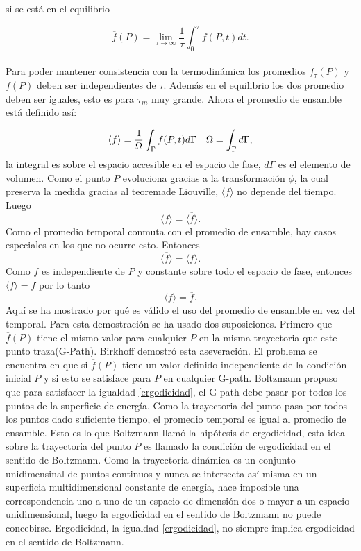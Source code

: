 si se está en el equilibrio

\begin{equation}
\overline{f}(P)= \lim_{\tau \to \infty} \frac{1}{\tau} \int_{0}^{\tau} f(P,t) dt.
\end{equation}
\\
Para poder mantener consistencia con la termodinámica los promedios $\overline{f_{\tau}}(P)$ y  $\overline{f}(P)$ deben ser independientes de $\tau$. Además en el equilibrio los dos promedio deben ser iguales, esto es para $\tau_{m}$ muy grande. Ahora el promedio de ensamble está definido así:

\begin{equation}
\langle f \rangle = \frac{1}{\Omega} \int_{\Gamma} f(P,t) d\Gamma \\
\quad \Omega= \int_{\Gamma} d\Gamma,
\end{equation}
la integral es sobre el espacio accesible en el espacio de fase, $d\Gamma$ es el elemento de volumen. Como el punto $P$ evoluciona gracias a la transformación $\phi$, la cual preserva la medida gracias al teoremade Liouville, $\langle f \rangle$ no depende del tiempo. Luego 
\begin{equation}
\langle f \rangle =  \overline{\langle f \rangle}.
\end{equation}
Como el promedio temporal conmuta con el promedio de ensamble, hay casos especiales en los que no ocurre esto. Entonces
\begin{equation}
\overline{\langle f \rangle} = \langle \overline{f} \rangle.
\end{equation}
Como $\overline{f}$ es independiente de $P$ y constante sobre  todo el espacio de fase, entonces $\langle \overline{f} \rangle= \overline{f}$ por lo tanto
\begin{equation} \label{ergodicidad}
\langle f \rangle = \overline{f}.
\end{equation}
Aquí se ha mostrado por qué es válido el uso del promedio de ensamble en vez del temporal. Para esta demostración se ha usado dos suposiciones. Primero que  $\overline{f}(P)$ tiene el mismo valor para cualquier $P$ en la misma trayectoria que este punto traza(G-Path). Birkhoff demostró esta aseveración. El problema se encuentra en que si $\overline{f}(P)$  tiene un valor definido independiente de la condición inicial $P$ y si esto se satisface para $P$ en cualquier G-path. Boltzmann propuso que para satisfacer la igualdad \ref{ergodicidad}, el G-path debe pasar por todos los puntos de la superficie de energía. Como la trayectoria del punto pasa por todos los puntos dado suficiente tiempo, el promedio temporal es igual al promedio de ensamble. Esto es lo que Boltzmann llamó la hipótesis de ergodicidad, esta idea sobre la trayectoria del punto $P$ es llamado la condición de ergodicidad en el sentido de Boltzmann. Como la trayectoria dinámica es un conjunto unidimensinal de puntos continuos y nunca se intersecta así misma en un superficia multidimensional constante de energía, hace imposible una correspondencia uno a uno de un espacio de dimensión dos o mayor a un espacio unidimensional, luego la ergodicidad en el sentido de Boltzmann no puede concebirse. Ergodicidad, la igualdad \ref{ergodicidad}, no siempre implica ergodicidad en el sentido de Boltzmann.

